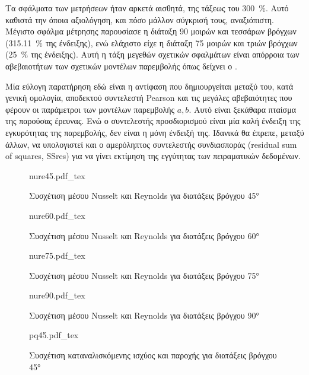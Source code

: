 Τα σφάλματα των μετρήσεων ήταν αρκετά αισθητά, της τάξεως του \qty{300}{\percent}. Αυτό καθιστά την όποια αξιολόγηση, και πόσο μάλλον σύγκρισή τους, αναξιόπιστη. Μέγιστο σφάλμα μέτρησης παρουσίασε η διάταξη 90 μοιρών και τεσσάρων βρόγχων (\qty{315.11}{\percent} της ένδειξης), ενώ ελάχιστο είχε η διάταξη 75 μοιρών και τριών βρόγχων (\qty{25}{\percent} της ένδειξης). Αυτή η τάξη μεγεθών σχετικών σφαλμάτων είναι απόρροια των αβεβαιοτήτων των σχετικών μοντέλων παρεμβολής όπως δείχνει ο .

Μία εύλογη παρατήρηση εδώ είναι η αντίφαση που δημιουργείται μεταξύ του, κατά γενική ομολογία, αποδεκτού συντελεστή Pearson και τις μεγάλες αβεβαιότητες που φέρουν οι παράμετροι των μοντέλων παρεμβολής $a, b$. Αυτό είναι ξεκάθαρα πταίσμα της παρούσας έρευνας. Ενώ ο συντελεστής προσδιορισμού είναι μία καλή ένδειξη της εγκυρότητας της παρεμβολής, δεν είναι η μόνη ένδειξή της. Ιδανικά θα έπρεπε, μεταξύ άλλων, να υπολογιστεί και ο αμερόληπτος συντελεστής συνδιασποράς (residual sum of squares, SSres) \cite{1991_Lyons_BOOK_CHAPTER} για να γίνει εκτίμηση της εγγύτητας των πειραματικών δεδομένων.
\clearpage

\begin{figure}[bt]
\centering
{nure45.pdf_tex}
\caption{Συσχέτιση μέσου Nusselt και Reynolds για διατάξεις βρόγχου \ang{45}}\label{nure45}
\end{figure}

\begin{figure}[bp]
\centering
{nure60.pdf_tex}
\caption{Συσχέτιση μέσου Nusselt και Reynolds για διατάξεις βρόγχου \ang{60}}\label{nure60}
\end{figure}
\clearpage

\begin{figure}[bp]
\centering
{nure75.pdf_tex}
\caption{Συσχέτιση μέσου Nusselt και Reynolds για διατάξεις βρόγχου \ang{75}}\label{nure75}
\end{figure}

\begin{figure}[bp]
\centering
{nure90.pdf_tex}
\caption{Συσχέτιση μέσου Nusselt και Reynolds για διατάξεις βρόγχου \ang{90}}\label{nure90}
\end{figure}
\clearpage

\begin{figure}[bp]
\centering
{pq45.pdf_tex}
\caption{Συσχέτιση καταναλισκόμενης ισχύος και παροχής για διατάξεις βρόγχου \ang{45}}\label{pq45}
\end{figure}

